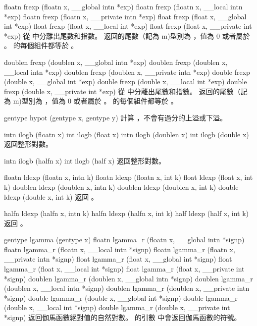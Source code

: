 floatn frexp (floatn x,
	__global intn *exp)
floatn frexp (floatn x,
	__local intn *exp)
floatn frexp (floatn x,
	__private intn *exp)
float frexp (float x,
	__global int *exp)
float frexp (float x,
	__local int *exp)
float frexp (float x,
	__private int *exp)
\stopbuffer
{}
從  中分離出尾數和指數。
返回的尾數（記為 m)型別為 ，值為 0 或者屬於 \math{[1/2, 1)}。
 的每個組件都等於 。
\stopbuffer

doublen frexp (doublen x,
	__global intn *exp)
doublen frexp (doublen x,
	__local intn *exp)
doublen frexp (doublen x,
	__private intn *exp)
double frexp (double x,
	__global int *exp)
double frexp (double x,
	__local int *exp)
double frexp (double x,
	__private int *exp)
\stopbuffer
{}
從  中分離出尾數和指數。
返回的尾數（記為 m)型別為 ，值為 0 或者屬於 \math{[1/2, 1)}。
 的每個組件都等於 。
\stopbuffer

gentype hypot (gentype x, gentype y)
\stopbuffer
{}
計算 ，不會有過分的上溢或下溢。
\stopbuffer

intn ilogb (floatn x)
int ilogb (float x)
intn ilogb (doublen x)
int ilogb (double x)
\stopbuffer
{}
返回整形對數。
\stopbuffer

intn ilogb (halfn x)
int ilogb (half x)
\stopbuffer
{}
返回整形對數。
\stopbuffer

floatn ldexp (floatn x, intn k)
floatn ldexp (floatn x, int k)
float ldexp (float x, int k)
doublen ldexp (doublen x, intn k)
doublen ldexp (doublen x, int k)
double ldexp (double x, int k)
\stopbuffer
{}
返回 。
\stopbuffer

halfn ldexp (halfn x, intn k)
halfn ldexp (halfn x, int k)
half ldexp (half x, int k)
\stopbuffer
{}
返回 。
\stopbuffer

gentype lgamma (gentype x)
floatn lgamma_r (floatn x,
	__global intn *signp)
floatn lgamma_r (floatn x,
	__local intn *signp)
floatn lgamma_r (floatn x,
	__private intn *signp)
float lgamma_r (float x,
	__global int *signp)
float lgamma_r (float x,
	__local int *signp)
float lgamma_r (float x,
	__private int *signp)
doublen lgamma_r (doublen x,
	__global intn *signp)
doublen lgamma_r (doublen x,
	__local intn *signp)
doublen lgamma_r (doublen x,
	__private intn *signp)
double lgamma_r (double x,
	__global int *signp)
double lgamma_r (double x,
	__local int *signp)
double lgamma_r (double x,
	__private int *signp)
\stopbuffer
{}
返回伽馬函數絕對值的自然對數。
 的引數  中會返回伽馬函數的符號。
\stopbuffer

